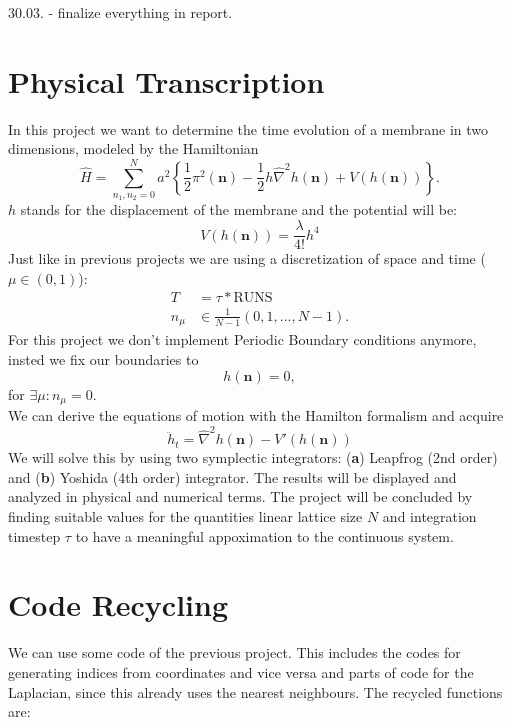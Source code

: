 \documentclass[11pt,a4paper]{article}
\begin{document}
30.03. - finalize everything in report.\\

\section{Physical Transcription}
In this project we want to determine the time evolution of a membrane in two dimensions, modeled by the Hamiltonian
\begin{equation}\label{Eq: Ham}
\hat{H} = \sum_{n_{1}, n_{2} = 0}^{N} a^{2} \left\{ \frac{1}{2} \pi^{2}(\mathbf{n}) - \frac{1}{2} h \hat{\nabla}^{2} h(\mathbf{n}) + V(h(\mathbf{n}))\right\}.  
\end{equation}
$h$ stands for the displacement of the membrane and the potential will be:
\begin{equation}
V(h(\mathbf{n})) = \frac{\lambda}{4!} h^{4}
\end{equation}
Just like in previous projects we are using a discretization of space and time ($\mu \in (0,1)$):
\begin{align}
	T & = \tau * \text{RUNS} \\
n_{\mu} & \in \frac{1}{N - 1} (0, 1, ..., N - 1).
\end{align}
For this project we don't implement Periodic Boundary conditions anymore, insted we fix our boundaries to
\begin{equation}
h(\mathbf{n}) = 0,
\end{equation}
for $\exists \mu: n_{\mu} = 0.$\\
We can derive the equations of motion with the Hamilton formalism and acquire
\begin{equation}\label{Eq: PDE1}
\ddot{h}_{t} = \hat{\nabla}^{2} h(\mathbf{n}) - V'(h(\mathbf{n}))
\end{equation}
We will solve this by using two symplectic integrators: (\textbf{a}) Leapfrog
(2nd order) and (\textbf{b}) Yoshida (4th order) integrator. The results will
be displayed and analyzed in physical and numerical terms. The project will be
concluded by finding suitable values for the quantities linear lattice size $N$
and integration timestep $\tau$ to have a meaningful appoximation to the
continuous system.


\section{Code Recycling}

We can use some code of the previous project. This includes the codes for
generating indices from coordinates and vice versa and parts of code for the
Laplacian, since this already uses the nearest neighbours. The recycled
functions are:
\end{document}

